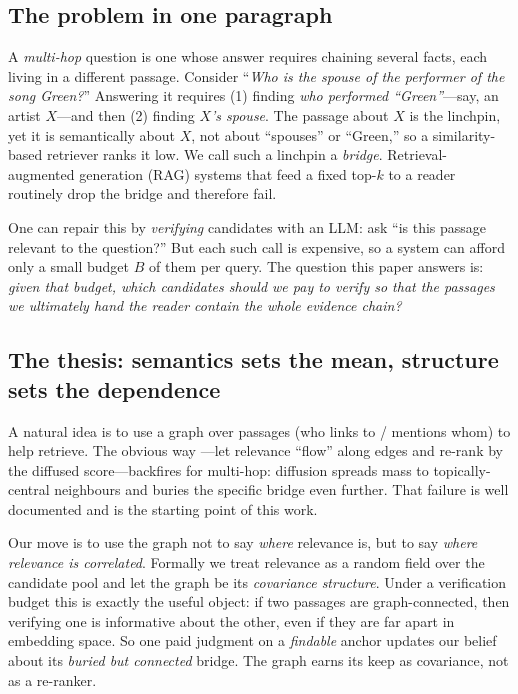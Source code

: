 \documentclass[11pt]{article}
\begin{document}
\subsection{The problem in one paragraph}
A \emph{multi-hop} question is one whose answer requires chaining several facts, each living in a different
passage. Consider ``\emph{Who is the spouse of the performer of the song Green?}'' Answering it requires (1)
finding \emph{who performed ``Green''}---say, an artist $X$---and then (2) finding \emph{$X$'s spouse}. The
passage about $X$ is the linchpin, yet it is semantically about $X$, not about ``spouses'' or ``Green,'' so a
similarity-based retriever ranks it low. We call such a linchpin a \emph{bridge}. Retrieval-augmented
generation (RAG) systems that feed a fixed top-$k$ to a reader routinely drop the bridge and therefore fail.

One can repair this by \emph{verifying} candidates with an LLM: ask ``is this passage relevant to the
question?'' But each such call is expensive, so a system can afford only a small budget $B$ of them per query.
The question this paper answers is: \emph{given that budget, which candidates should we pay to verify so that
the passages we ultimately hand the reader contain the whole evidence chain?}

\subsection{The thesis: semantics sets the mean, structure sets the dependence}
A natural idea is to use a graph over passages (who links to / mentions whom) to help retrieve. The obvious way
---let relevance ``flow'' along edges and re-rank by the diffused score---backfires for multi-hop: diffusion
spreads mass to topically-central neighbours and buries the specific bridge even further. That failure is well
documented and is the starting point of this work.

Our move is to use the graph not to say \emph{where} relevance is, but to say \emph{where relevance is
correlated}. Formally we treat relevance as a random field over the candidate pool and let the graph be its
\emph{covariance structure}. Under a verification budget this is exactly the useful object: if two passages are
graph-connected, then verifying one is informative about the other, even if they are far apart in embedding
space. So one paid judgment on a \emph{findable} anchor updates our belief about its \emph{buried but connected}
bridge. The graph earns its keep as covariance, not as a re-ranker.
\end{document}
